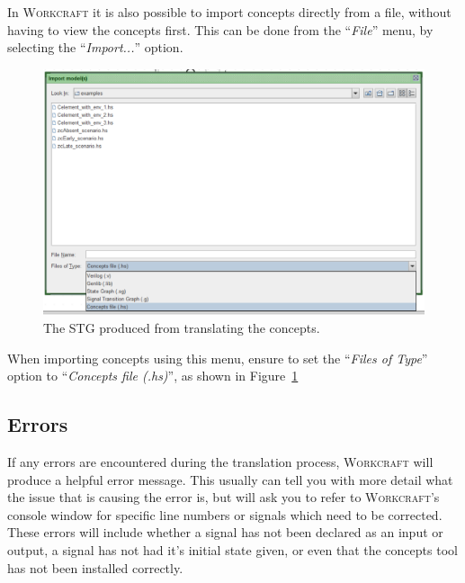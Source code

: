 \documentclass{proc}
\newcommand{\noun}[1]{\textsc{#1}}
\begin{document}
In \noun{Workcraft} it is also possible to import concepts directly from a file, without having to view the concepts first. 
This can be done from the ``\emph{File}'' menu, by selecting the ``\emph{Import...}'' option. 

\begin{figure}[H]
\begin{centering}
\includegraphics[scale=0.4]{images/import_menu_screenshot}
\par\end{centering}

\begin{centering}
\protect\caption{\label{fig:import_menu_screenshot}The STG produced from translating the concepts.}

\par\end{centering}

\end{figure}

When importing concepts using this menu, ensure to set the ``\emph{Files of Type}'' option to ``\emph{Concepts file (.hs)}'', as shown in Figure~\ref{fig:import_menu_screenshot}

\subsection{Errors}

If any errors are encountered during the translation process, \noun{Workcraft} will produce a helpful error message. 
This usually can tell you with more detail what the issue that is causing the error is, but will ask you to refer to \noun{Workcraft}'s console window for specific line numbers or signals which 
need to be corrected. 
These errors will include whether a signal has not been declared as an input or output,
a signal has not had it's initial state given, or even that the concepts tool has not been installed correctly. 
\end{document}
